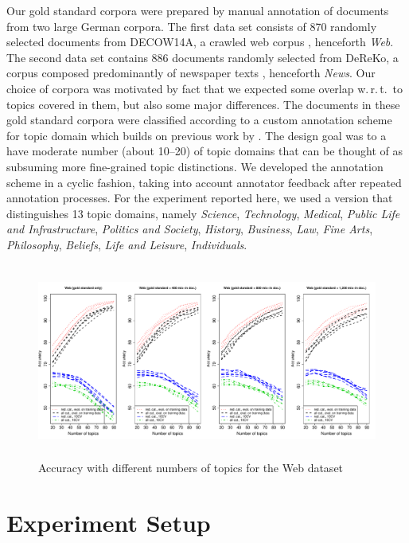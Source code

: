 \documentclass[11pt]{article}
\begin{document}
Our gold standard corpora were prepared by manual annotation of documents from two large German corpora.
The first data set consists of 870 randomly selected documents from DECOW14A, a crawled web corpus \cite{SchaeferBildhauer2012a,Schaefer2015b}, henceforth \textit{Web}.
The second data set contains 886 documents randomly selected from DeReKo, a corpus composed predominantly of newspaper texts \cite{KupietzEa2010}, henceforth \textit{News}. 
Our choice of corpora was motivated by fact that we expected some overlap w.\,r.\,t.\ to topics covered in them, but also some major differences. 
The documents in these gold standard corpora were classified according to a custom annotation scheme for topic domain which builds on previous work by .
The design goal was to a have moderate number (about 10--20) of topic domains that can be thought of as subsuming more fine-grained topic distinctions.
We developed the annotation scheme in a cyclic fashion, taking into account annotator feedback after repeated annotation processes.
For the experiment reported here, we used a version that distinguishes 13 topic domains, namely \textit{Science}, \textit{Technology}, \textit{Medical}, \textit{Public Life and Infrastructure}, \textit{Politics and Society}, \textit{History}, \textit{Business}, \textit{Law}, \textit{Fine Arts},  \textit{Philosophy}, \textit{Beliefs},  \textit{Life and Leisure}, \textit{Individuals}.

\begin{figure}[!ht]
  \centering
  \includegraphics[width=\textwidth, height=6.4cm]{graphics/cow.pdf}
  \caption{Accuracy with different numbers of topics for the Web dataset}
  \label{fig:cow}
\end{figure}

\section{Experiment Setup}
\label{sec:experiment}
\end{document}
